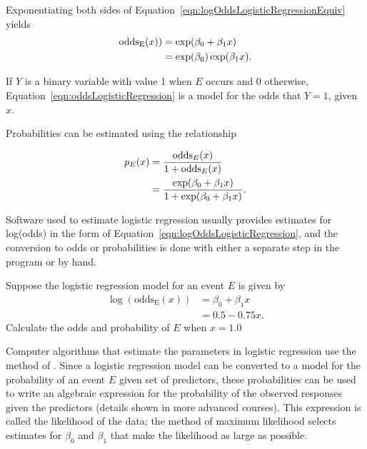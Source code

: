 Exponentiating both sides of Equation~\ref{eqn:logOddsLogisticRegressionEquiv} yields
\begin{align}
  \text{odds}_\text{E}(x)) &= \exp(\beta_0 + \beta_1 x) \notag \\
  &= \exp(\beta_0) \exp(\beta_1 x).
    \label{eqn:oddsLogisticRegression}
\end{align}

If $Y$ is a binary variable with value 1 when $E$ occurs and 0 otherwise,
Equation~\ref{eqn:oddsLogisticRegression} is a model for the odds that $Y = 1$, given $x$.

Probabilities can be estimated using the relationship

\begin{align}
  p_{E}(x) &= \frac{\text{odds}_{E}(x)}{1 + \text{odds}_{E}(x)} \notag \\
        &= \frac{\exp(\beta_0 + \beta_1 x)}
        { 1 + \exp(\beta_0 + \beta_1 x)}.
        \label{eqn:probLogisticRegression}
 \end{align}

Software used to estimate logistic regression usually provides estimates for log(odds) in the form of Equation~\ref{eqn:logOddsLogisticRegression}, and the conversion to odds or probabilities is done with either a separate step in the program or by hand.

\begin{exercisewrap}
\begin{nexercise}\label{guidedPracticeSimpleModel}
Suppose the logistic regression model for an event $E$ is given by
\begin{align*}
\log(\text{odds}_\text{E}(x)) &= \beta_0 + \beta_1 x \\
             &= 0.5 - 0.75x.
\end{align*}
Calculate the odds and probability of $E$ when $x = 1.0$
\footnotemark{}
\end{nexercise}
\end{exercisewrap}

Computer algorithms that estimate the parameters in logistic regression use the method of .  Since a logistic regression model can be converted to a model for the probability of an event $E$ given set of predictors, these probabilities can be used to write an algebraic expression for the probability of the observed responses given the predictors (details shown in more advanced courses).  This expression is called the likelihood of the data; the method of maximum likelihood selects estimates for $\beta_0$ and $\beta_1$ that make the likelihood as large as possible.

